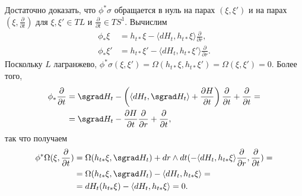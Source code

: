 Достаточно доказать, что $\phi^\ast \sigma$ обращается в нуль на парах $(\xi, \xi')$ и на парах  $(\xi, \tfrac{\partial}{\partial t})$ для $\xi, \xi' \in T L$ и $\tfrac{\partial}{\partial t} \in T S^1$.
Вычислим 
\begin{align*}
\phi_\ast \xi
&= h_{t\ast} \xi - \langle dH_t, h_{t\ast} \xi\rangle
\frac{\partial}{\partial r},
\\
\phi_\ast \xi'
&= h_{t\ast} \xi' - \langle dH_t, h_{t\ast} \xi'\rangle
\frac{\partial}{\partial r}.
\end{align*}
Поскольку $L$ лагранжево, $\phi^\ast \sigma (\xi, \xi') = \Omega (h_{t\ast} \xi, h_{t\ast} \xi') = \Omega (\xi, \xi') = 0$.
Более того,
\begin{align*}
\phi_\ast\frac{\partial}{\partial t}
&= \sgrad H_t - 
\left( \langle dH_t, \sgrad H_t \rangle +\frac{\partial H}{\partial t}\right) \frac{\partial}{\partial t} +\frac{\partial}{\partial t}=
\\
&=\sgrad H_t - \frac{\partial H}{\partial t}\frac{\partial}{\partial r} +\frac{\partial}{\partial t},
\end{align*}
так что получаем
\begin{align*}
\phi^\ast \Omega (\xi, \frac{\partial}{\partial t})
&= \Omega (h_{t\ast} \xi, \sgrad H_t) + dr \wedge dt (-\langle dH_t, h_{t\ast} \xi\rangle \frac{\partial}{\partial r},\frac{\partial}{\partial t}) =
\\
&=\Omega (h_{t\ast} \xi, \sgrad H_t) - \langle dH_t, h_{t\ast} \xi\rangle =
\\
&=dH_t (h_{t\ast} \xi) - \langle dH_t, h_{t\ast} \xi\rangle = 0.
\end{align*}
\qeds
